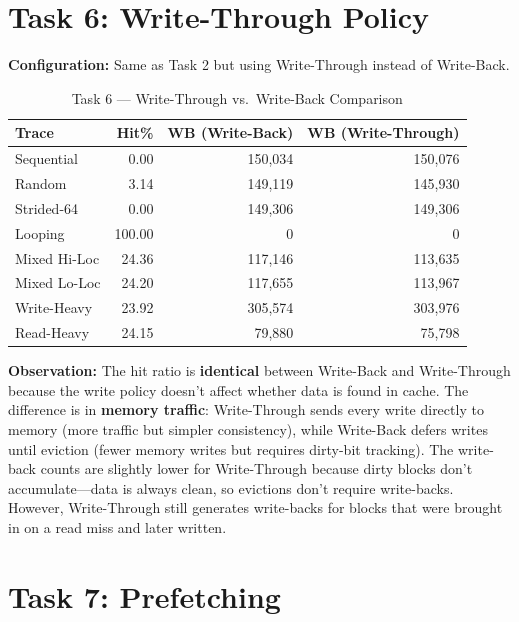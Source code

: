 \documentclass[12pt,a4paper]{article}
\begin{document}
\section{Task 6: Write-Through Policy}

\textbf{Configuration:} Same as Task 2 but using Write-Through instead of Write-Back.

\begin{table}[H]
\centering
\caption{Task 6 --- Write-Through vs.\ Write-Back Comparison}
\begin{tabular}{lr|rr}
\toprule
\textbf{Trace} & \textbf{Hit\%} & \textbf{WB (Write-Back)} & \textbf{WB (Write-Through)} \\
\midrule
Sequential     & 0.00  & 150,034 & 150,076 \\
Random         & 3.14  & 149,119 & 145,930 \\
Strided-64     & 0.00  & 149,306 & 149,306 \\
Looping        & 100.00& 0       & 0       \\
Mixed Hi-Loc   & 24.36 & 117,146 & 113,635 \\
Mixed Lo-Loc   & 24.20 & 117,655 & 113,967 \\
Write-Heavy    & 23.92 & 305,574 & 303,976 \\
Read-Heavy     & 24.15 & 79,880  & 75,798  \\
\bottomrule
\end{tabular}
\end{table}

\textbf{Observation:} The hit ratio is \textbf{identical} between Write-Back and Write-Through because the write policy doesn't affect whether data is found in cache. The difference is in \textbf{memory traffic}: Write-Through sends every write directly to memory (more traffic but simpler consistency), while Write-Back defers writes until eviction (fewer memory writes but requires dirty-bit tracking). The write-back counts are slightly lower for Write-Through because dirty blocks don't accumulate---data is always clean, so evictions don't require write-backs. However, Write-Through still generates write-backs for blocks that were brought in on a read miss and later written.

\section{Task 7: Prefetching}
\end{document}
